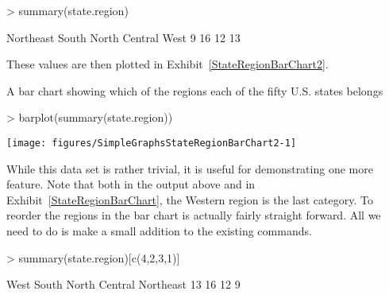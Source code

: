 \begin{Schunk}
\begin{Sinput}
> summary(state.region) 
\end{Sinput}
\begin{Soutput}
    Northeast         South North Central          West 
            9            16            12            13 
\end{Soutput}
\end{Schunk}

These values are then plotted in Exhibit~\ref{StateRegionBarChart2}. 
\begin{exhibit} 
\begin{center} 
\caption{A bar chart showing which of the regions each of the fifty U.S. states belongs} 
\label{StateRegionBarChart2} 

\begin{Schunk}
\begin{Sinput}
> barplot(summary(state.region)) 
\end{Sinput}

\texttt{[image: figures/SimpleGraphsStateRegionBarChart2-1]} \end{Schunk}

\end{center} 
\end{exhibit} 
 
While this data set is rather trivial, it is useful for demonstrating one more feature. Note that both in the output above and in Exhibit~\ref{StateRegionBarChart}, the Western region is the last category. To reorder the regions in the bar chart is actually fairly straight forward. All we need to do is make a small addition to the existing commands. 

\begin{Schunk}
\begin{Sinput}
> summary(state.region)[c(4,2,3,1)] 
\end{Sinput}
\begin{Soutput}
         West         South North Central     Northeast 
           13            16            12             9 
\end{Soutput}
\end{Schunk}

